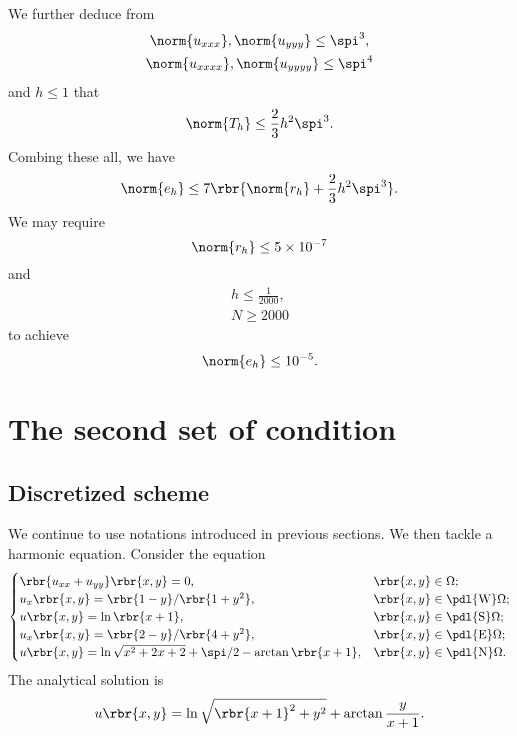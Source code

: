 \documentclass[english, nochinese]{pnote}
\begin{document}
We further deduce from
\begin{gather}
\norm{u_{ x x x }}, \norm{u_{ y y y }} \le \spi^3, \\
\norm{u_{ x x x x }}, \norm{u_{ y y y y }} \le \spi^4
\end{gather}
and $ h \le 1 $ that
\begin{equation}
\norm{T_h} \le \frac{2}{3} h^2 \spi^3.
\end{equation}
Combing these all, we have
\begin{equation}
\norm{e_h} \le 7 \rbr{ \norm{r_h} + \frac{2}{3} h^2 \spi^3 }.
\end{equation}
We may require
\begin{equation}
\norm{r_h} \le 5 \times 10^{-7}
\end{equation}
and
\begin{gather}
h \le \frac{1}{2000}, \\
N \ge 2000
\end{gather}
to achieve
\begin{equation}
\norm{e_h} \le 10^{-5}.
\end{equation}

\section{The second set of condition}

\subsection{Discretized scheme}

We continue to use notations introduced in previous sections. We then tackle a harmonic equation. Consider the equation
\begin{equation}
\begin{cases}
\rbr{ u_{ x x } + u_{ y y } } \rbr{ x, y } = 0, & \rbr{ x, y } \in \Omega; \\
u_x \rbr{ x, y } = \rbr{ 1 - y } / \rbr{ 1 + y^2 }, & \rbr{ x, y } \in \pdl{\text{W}} \Omega; \\
u \rbr{ x, y } = \ln \rbr{ x + 1 }, & \rbr{ x, y } \in \pdl{\text{S}} \Omega; \\
u_x \rbr{ x, y } = \rbr{ 2 - y } / \rbr{ 4 + y^2 }, & \rbr{ x, y } \in \pdl{\text{E}} \Omega; \\
u \rbr{ x, y } = \ln \sqrt{ x^2 + 2 x + 2 } + \spi / 2 - \arctan \rbr{ x + 1 }, & \rbr{ x, y } \in \pdl{\text{N}} \Omega.
\end{cases}
\end{equation}
The analytical solution is
\begin{equation}
u \rbr{ x, y } = \ln \sqrt{ \rbr{ x + 1 }^2 + y^2 } + \arctan \frac{y}{ x + 1 }.
\end{equation}
\end{document}
